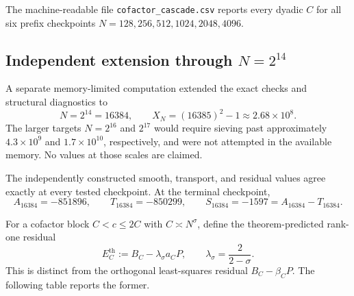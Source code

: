 \documentclass[11pt]{article}
\theoremstyle{definition}
\newcommand{\1}{\mathbf{1}}
\begin{document}
The machine-readable file \texttt{cofactor\_cascade.csv} reports every dyadic $C$ for all six prefix checkpoints $N=128,256,512,1024,2048,4096$.

\subsection{Independent extension through $N=2^{14}$}
\label{subsec:numerics-16384}

A separate memory-limited computation extended the exact checks and structural diagnostics to
\begin{equation}
 N=2^{14}=16384,
 \qquad
 X_N=(16385)^2-1\approx2.68\times10^8.
 \label{eq:extended-range-16384}
\end{equation}
The larger targets $N=2^{16}$ and $2^{17}$ would require sieving past approximately $4.3\times10^9$ and $1.7\times10^{10}$, respectively, and were not attempted in the available memory.  No values at those scales are claimed.

The independently constructed smooth, transport, and residual values agree exactly at every tested checkpoint.  At the terminal checkpoint,
\begin{equation}
 \boxed{
 A_{16384}=-851896,
 \qquad
 T_{16384}=-850299,
 \qquad
 S_{16384}=-1597=A_{16384}-T_{16384}.
 }
 \label{eq:extended-terminal-identity}
\end{equation}

For a cofactor block $C<c\le2C$ with $C\asymp N^\sigma$, define the theorem-predicted rank-one residual
\begin{equation}
 E_C^{\mathrm{th}}
 :=B_C-\lambda_\sigma a_C P,
 \qquad
 \lambda_\sigma=\frac{2}{2-\sigma}.
 \label{eq:theorem-predicted-residual}
\end{equation}
This is distinct from the orthogonal least-squares residual $B_C-\widehat\beta_CP$.  The following table reports the former.
\end{document}
